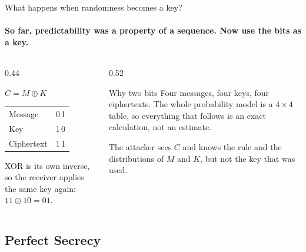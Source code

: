 \documentclass[11pt,aspectratio=169]{beamer}
\newcommand{\msg}{M}
\newcommand{\key}{K}
\newcommand{\ctxt}{C}
\newcommand{\xor}{\oplus}
\newcommand{\keyeq}[1]{\begin{center}\large\color{deep}$\displaystyle #1$\end{center}}
\begin{document}
\begin{frame}{What happens when randomness becomes a key?}
  \framesubtitle{So far, predictability was a property of a sequence. Now use the bits as a key.}
  \begin{columns}[T]
    \begin{column}{0.44\textwidth}
      \keyeq{\ctxt=\msg\xor\key}
      \begin{center}
        {\Large\ttfamily
        \begin{tabular}{@{}lc@{}}
          \color{muted}Message    & 0\,1 \\
          \color{muted}Key        & 1\,0 \\
          \midrule
          \color{deep}Ciphertext & \color{deep}1\,1
        \end{tabular}}
      \end{center}
      XOR is its own inverse, so the receiver applies the same key again:
      $11\xor10=01$.
    \end{column}
    \begin{column}{0.52\textwidth}
      \begin{block}{Why two bits}
        Four messages, four keys, four ciphertexts. The whole probability
        model is a $4\times4$ table, so everything that follows is an
        exact calculation, not an estimate.
      \end{block}
      \smallskip
      The attacker sees $\ctxt$ and knows the rule and the distributions of
      $\msg$ and $\key$, but not the key that was used.
    \end{column}
  \end{columns}
\end{frame}

\subsection{Perfect Secrecy}
\end{document}

